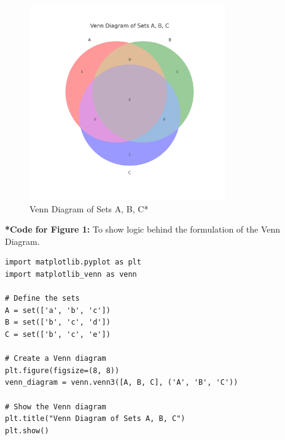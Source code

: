 \documentclass[12pt]{article}
\begin{document}
\begin{figure}[h]
\centering
\includegraphics[width=0.75\textwidth]{venn_diagram.png} %
\caption{Venn Diagram of Sets A, B, C*}
\end{figure}

\newpage
\textbf{*Code for Figure 1:} To show logic behind the formulation of the Venn Diagram.
\begin{lstlisting}
import matplotlib.pyplot as plt
import matplotlib_venn as venn

# Define the sets
A = set(['a', 'b', 'c'])
B = set(['b', 'c', 'd'])
C = set(['b', 'c', 'e'])

# Create a Venn diagram
plt.figure(figsize=(8, 8))
venn_diagram = venn.venn3([A, B, C], ('A', 'B', 'C'))

# Show the Venn diagram
plt.title("Venn Diagram of Sets A, B, C")
plt.show()
\end{lstlisting}
\end{document}
